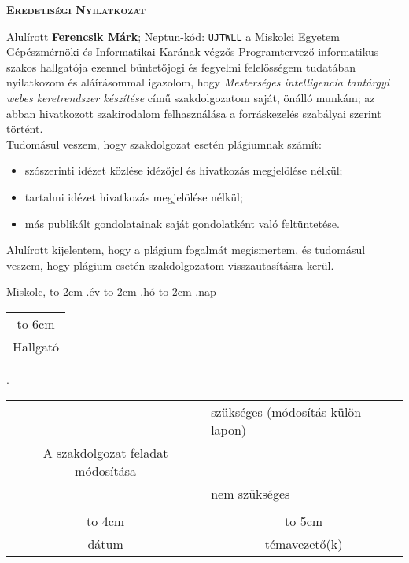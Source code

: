     \vspace*{1cm}  
    \begin{center}
    \large\textsc{\bfseries Eredetiségi Nyilatkozat}
    \end{center}
    \vspace*{2cm}  
    
    Alulírott \textbf{Ferencsik Márk}; Neptun-kód: \texttt{UJTWLL} a Miskolci Egyetem Gépészmérnöki és Informatikai Karának végzős Programtervező informatikus szakos hallgatója ezennel büntetőjogi és fegyelmi felelősségem tudatában nyilatkozom és aláírásommal igazolom, hogy \textit{Mesterséges intelligencia tantárgyi webes keretrendszer készítése}
    című szakdolgozatom saját, önálló munkám; az abban hivatkozott szakirodalom
    felhasználása a forráskezelés szabályai szerint történt.\\
    
    Tudomásul veszem, hogy szakdolgozat esetén plágiumnak számít:
    \begin{itemize}
    \item szószerinti idézet közlése idézőjel és hivatkozás megjelölése nélkül;
    \item tartalmi idézet hivatkozás megjelölése nélkül;
    \item más publikált gondolatainak saját gondolatként való feltüntetése.
    \end{itemize}
    
    Alulírott kijelentem, hogy a plágium fogalmát megismertem, és tudomásul veszem, hogy
    plágium esetén szakdolgozatom visszautasításra kerül.
    
    \vspace*{3cm}
    
    \noindent Miskolc, \hbox to 2cm{\dotfill} .év \hbox to 2cm{\dotfill} .hó \hbox to 2cm{\dotfill} .nap
    
    \vspace*{3cm}
    
    \hspace*{8cm}\begin{tabular}{c}
    \hbox to 6cm{\dotfill}\\
    Hallgató
    \end{tabular}
    
    
    
    \newpage
    
    .
    
    \begin{tabular}{cl}
    &szükséges (módosítás külön lapon) \\
    A szakdolgozat feladat módosítása& \\
    & nem szükséges\\
    &\\
    \hbox to 4cm{\dotfill}&\multicolumn{1}{c}{\hbox to 5cm{\dotfill}}\\
    dátum& \multicolumn{1}{c}{témavezető(k)}
    \end{tabular}
    \vskip1.5mm
    
